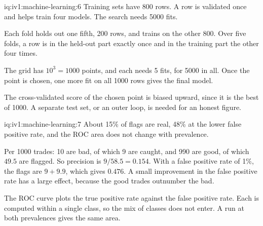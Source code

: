 \begin{solution}{iq:iv1:machine-learning:6}
Training sets have 800 rows. A row is validated once and helps train four models. The search needs 5000 fits.

Each fold holds out one fifth, 200 rows, and trains on the other 800. Over five folds, a row is in the held-out part exactly once and in the training part the other four times.

The grid has $10^3 = 1000$ points, and each needs 5 fits, for 5000 in all. Once the point is chosen, one more fit on all 1000 rows gives the final model.

The cross-validated score of the chosen point is biased upward, since it is the best of 1000. A separate test set, or an outer loop, is needed for an honest figure.



\end{solution}

\begin{solution}{iq:iv1:machine-learning:7}
About 15\% of flags are real, 48\% at the lower false positive rate, and the ROC area does not change with prevalence.

Per 1000 trades: 10 are bad, of which 9 are caught, and 990 are good, of which $49.5$ are flagged. So precision is $9/58.5 = 0.154$. With a false positive rate of 1\%, the flags are $9 + 9.9$, which gives $0.476$. A small improvement in the false positive rate has a large effect, because the good trades outnumber the bad.

The ROC curve plots the true positive rate against the false positive rate. Each is computed within a single class, so the mix of classes does not enter. A run at both prevalences gives the same area.



\end{solution}

